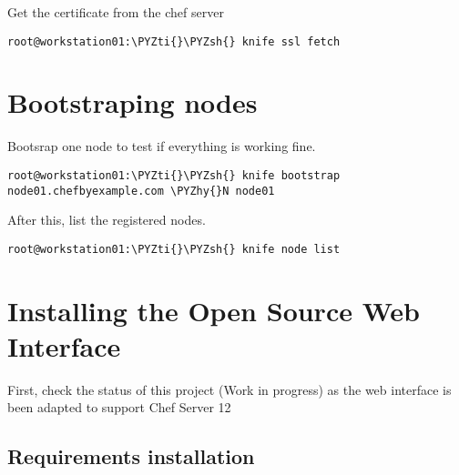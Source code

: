 Get the certificate from the chef server

\begin{codelisting}
\label{code:}
\codecaption{}
\begin{Verbatim}[fontsize=\relsize{-2.5},fontseries=b,commandchars=\\\{\}]
root@workstation01:\PYZti{}\PYZsh{} knife ssl fetch
\end{Verbatim}
\end{codelisting}

\section{Bootstraping nodes}

Bootsrap one node to test if everything is working fine.

\begin{codelisting}
\label{code:}
\codecaption{}
\begin{Verbatim}[fontsize=\relsize{-2.5},fontseries=b,commandchars=\\\{\}]
root@workstation01:\PYZti{}\PYZsh{} knife bootstrap node01.chefbyexample.com \PYZhy{}N node01
\end{Verbatim}
\end{codelisting}

After this, list the registered nodes.

\begin{codelisting}
\label{code:}
\codecaption{}
\begin{Verbatim}[fontsize=\relsize{-2.5},fontseries=b,commandchars=\\\{\}]
root@workstation01:\PYZti{}\PYZsh{} knife node list
\end{Verbatim}
\end{codelisting}

\section{Installing the Open Source Web Interface}

First, check the status of this project (Work in progress) as 
the web interface is been adapted to support Chef Server 12

\subsection{Requirements installation}

